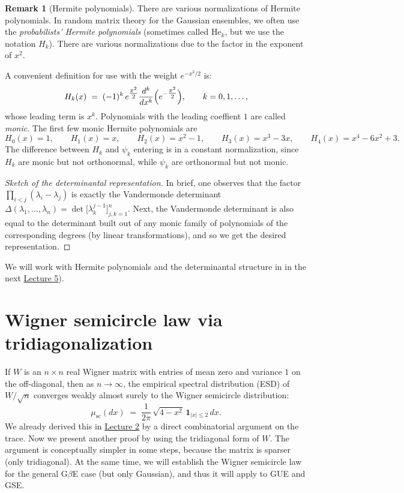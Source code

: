 \documentclass[letterpaper,11pt,oneside,reqno]{article}
\numberwithin{equation}{section}
\theoremstyle{definition}
\newtheorem{remark}[proposition]{Remark}
\begin{document}
\begin{remark}[Hermite polynomials]
  There are various normalizations of Hermite polynomials. 
  In random matrix theory for the Gaussian ensembles, 
  we often use the \emph{probabilists' Hermite polynomials} 
	(sometimes called \(\mathrm{He}_k\), but we use the notation $H_k$).
	There are various normalizations due to the factor in the exponent
	of $x^2$.

  A convenient definition for use with the weight \(e^{-x^2/2}\) is:
  \[
    H_k(x)
    \;=\;
    (-1)^k\, e^{\tfrac{x^2}{2}}
    \frac{d^k}{dx^k}
    \Bigl(e^{-\tfrac{x^2}{2}}\Bigr),
		\qquad 
		k=0,1,\ldots,
  \]
  whose leading term is \(x^k\). 
	Polynomials with the leading coeffient \(1\) are called \emph{monic}.
	The first few monic Hermite polynomials are
	\[
		H_0(x) = 1,\qquad
		H_1(x) = x,\qquad
		H_2(x) = x^2 - 1,\qquad
		H_3(x) = x^3 - 3x,\qquad 
		H_4(x) = x^4 - 6x^2 + 3.
	\]
	The difference between $H_k$ and $\psi_k$ entering 
	is in a constant normalization,
	since $H_k$ are monic but not orthonormal, 
	while $\psi_k$ are orthonormal but not monic.
\end{remark}

\begin{proof}[Sketch of the determinantal representation]
  In brief, one observes that the factor 
  \(\prod_{i<j}(\lambda_i - \lambda_j)\) 
  is exactly the Vandermonde determinant 
  \(\Delta(\lambda_1,\dots,\lambda_n) 
  = \det\bigl[\lambda_k^{j-1}\bigr]_{j,k=1}^n\).
	Next, the Vandermonde determinant is also equal to 
	the determinant built out of any monic family of polynomials of the corresponding
	degrees (by linear transformations), and so we get the desired
	representation.
\end{proof}

We will work with Hermite polynomials 
and the determinantal structure in  
in the next 
\href{https://lpetrov.cc/rmt25/rmt25-notes/rmt2025-l05.pdf}{Lecture 5}).

\section{Wigner semicircle law via tridiagonalization}
\label{sec:semicircle-tridiagonal}


If $W$ is an $n\times n$ real Wigner matrix with entries of
mean zero and variance $1$ on the off-diagonal, then as
$n\to\infty$, the empirical spectral distribution (ESD) of
$W/\sqrt{n}$ converges weakly almost surely to the Wigner
semicircle distribution:
\[
  \mu_{\mathrm{sc}}(dx)
  \;=\;
  \frac{1}{2\pi}\,\sqrt{4 - x^2}\,\mathbf{1}_{|x|\le2}\,dx.
\]
We already derived this in 
\href{https://lpetrov.cc/rmt25/rmt25-notes/rmt2025-l02.pdf}{Lecture 2}
by a direct combinatorial argument on the trace. Now we present another proof by using the tridiagonal form of $W$.  The argument is conceptually simpler in some steps, because the matrix is sparser (only tridiagonal).
At the same time, we will establish the Wigner
semicircle law for the general G$\beta$E case (but only Gaussian), and 
thus it will apply to GUE and GSE.
\end{document}
